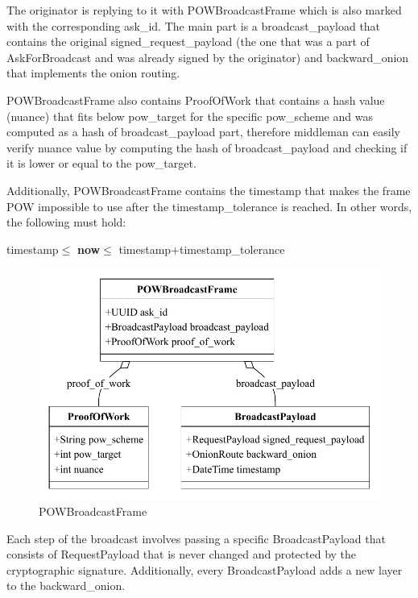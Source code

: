 \documentclass{article}
\begin{document}
The originator is replying to it with POWBroadcastFrame which is also marked with the corresponding ask\_id. The main part is a broadcast\_payload that contains the original signed\_request\_payload (the one that was a part of AskForBroadcast and was already signed by the originator) and backward\_onion that implements the onion routing.

POWBroadcastFrame also contains ProofOfWork that contains a hash value (nuance) that fits below pow\_target for the specific pow\_scheme and was computed as a hash of broadcast\_payload part, therefore middleman can easily verify nuance value by computing the hash of broadcast\_payload and checking if it is lower or equal to the pow\_target. 

Additionally, POWBroadcastFrame contains the timestamp that makes the frame POW impossible to use after the timestamp\_tolerance is reached. In other words, the following must hold:

\begin{center}
	timestamp$\le$ \textbf{now}$\le$ timestamp+timestamp\_tolerance
\end{center}

\begin{figure}
	\centering
	\includegraphics[scale=0.7]{POWBroadcastFrame.pdf}
	\caption{POWBroadcastFrame}
	\label{fig:fr:powbroadcastframe}
\end{figure}


Each step of the broadcast involves passing a specific BroadcastPayload that consists of RequestPayload that is never changed and protected by the cryptographic signature.  Additionally, every BroadcastPayload adds a new layer to the backward\_onion.
\end{document}
